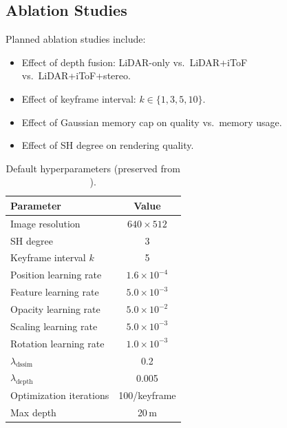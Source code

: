 \subsection{Ablation Studies}

Planned ablation studies include:
\begin{itemize}
    \item Effect of depth fusion: LiDAR-only vs.\ LiDAR+iToF vs.\ LiDAR+iToF+stereo.
    \item Effect of keyframe interval: $k \in \{1, 3, 5, 10\}$.
    \item Effect of Gaussian memory cap on quality vs.\ memory usage.
    \item Effect of SH degree on rendering quality.
\end{itemize}

\begin{table}[h]
\centering
\caption{Default hyperparameters (preserved from \gaussianlic).}
\label{tab:hyperparams}
\begin{tabular}{lc}
\toprule
Parameter & Value \\
\midrule
Image resolution & $640 \times 512$ \\
SH degree & 3 \\
Keyframe interval $k$ & 5 \\
Position learning rate & $1.6 \times 10^{-4}$ \\
Feature learning rate & $5.0 \times 10^{-3}$ \\
Opacity learning rate & $5.0 \times 10^{-2}$ \\
Scaling learning rate & $5.0 \times 10^{-3}$ \\
Rotation learning rate & $1.0 \times 10^{-3}$ \\
$\lambda_{\text{dssim}}$ & 0.2 \\
$\lambda_{\text{depth}}$ & 0.005 \\
Optimization iterations & 100/keyframe \\
Max depth & 20\,m \\
\bottomrule
\end{tabular}
\end{table}
